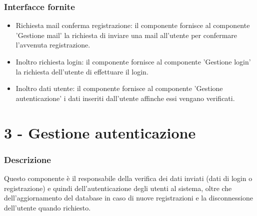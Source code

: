 \documentclass[a4paper,12pt]{article}
\begin{document}
\subsubsection*{Interfacce fornite}
\begin{itemize} \setlength\itemsep{0.01em}
\item {\sffamily Richiesta mail conferma registrazione}: il componente fornisce al componente 'Gestione mail' la richiesta di inviare una mail all'utente per confermare l'avvenuta registrazione.
\item {\sffamily Inoltro richiesta login}: il componente fornisce al componente 'Gestione login' la richiesta dell'utente di effettuare il login.
\item {\sffamily Inoltro dati utente}: il componente fornisce al componente 'Gestione autenticazione' i dati inseriti dall'utente affinche essi vengano verificati.
\end{itemize}



\section*{3 - Gestione autenticazione}
\subsubsection*{Descrizione}
Questo componente è il responsabile della verifica dei dati inviati (dati di login o registrazione) e quindi dell’autenticazione degli utenti al sistema, oltre che dell'aggiornamento del database in caso di nuove registrazioni e la disconnessione dell'utente quando richiesto.
\end{document}

